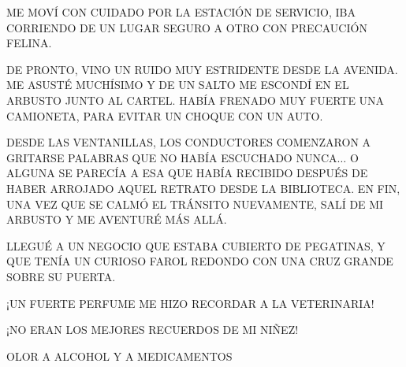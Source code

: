 \newpage
{}
ME MOVÍ CON CUIDADO POR LA ESTACIÓN DE SERVICIO, IBA CORRIENDO 	DE UN LUGAR SEGURO A OTRO CON PRECAUCIÓN FELINA. 

DE PRONTO, VINO UN RUIDO MUY ESTRIDENTE DESDE LA AVENIDA. ME ASUSTÉ MUCHÍSIMO Y DE UN SALTO ME ESCONDÍ EN EL ARBUSTO JUNTO AL CARTEL. HABÍA FRENADO MUY FUERTE UNA CAMIONETA, PARA EVITAR UN CHOQUE CON UN AUTO. 

DESDE LAS VENTANILLAS, LOS CONDUCTORES COMENZARON A GRITARSE PALABRAS QUE NO HABÍA ESCUCHADO NUNCA$\ldots$ O ALGUNA SE PARECÍA A ESA QUE HABÍA RECIBIDO DESPUÉS DE HABER ARROJADO AQUEL RETRATO DESDE LA BIBLIOTECA. EN FIN, UNA VEZ QUE SE CALMÓ EL TRÁNSITO NUEVAMENTE, SALÍ DE MI ARBUSTO Y ME AVENTURÉ MÁS ALLÁ.

LLEGUÉ A UN NEGOCIO QUE ESTABA CUBIERTO DE PEGATINAS, Y QUE TENÍA UN CURIOSO FAROL REDONDO CON UNA CRUZ GRANDE SOBRE SU PUERTA.




\newpage
{}

\vspace{.8\textheight}
¡UN FUERTE  PERFUME ME HIZO RECORDAR A LA VETERINARIA!	




\newpage
{}
\vspace{.8\textheight}
¡NO ERAN LOS MEJORES RECUERDOS DE MI NIÑEZ!	

OLOR A ALCOHOL Y A MEDICAMENTOS




